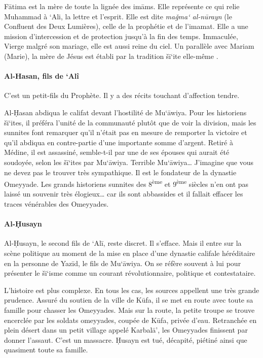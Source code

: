 Fātima est la mère de toute la lignée des imāms. Elle représente ce qui
relie Muhammad à `Ali, la lettre et l'esprit. Elle est dite \emph{maǧma`
al-nūrayn} (le Confluent des Deux Lumières), celle de la prophétie et de
l'imamat. Elle a une mission d'intercession et de protection jusqu'à la
fin des temps. Immaculée, Vierge malgré son mariage, elle est aussi
reine du ciel. Un parallèle avec Mariam (Marie), la mère de Jésus est
établi par la tradition šī`ite elle-même .

 
\paragraph{Al-Hasan, fils de
`Alî}\label{al-hasan-fils-de-aluxee}

C'est un petit-fils du Prophète. Il y a des récits touchant d'affection
tendre.

Al-Ḥasan abdiqua le califat devant l'hostilité de Mu`āwiya. Pour les
historiens šī`ites, il préféra l'unité de la communauté plutôt que de
voir la division, mais les sunnites font remarquer qu'il n'était pas en
mesure de remporter la victoire et qu'il abdiqua en contre-partie d'une
importante somme d'argent. Retiré à Médine, il est assassiné,
semble-t-il par une de ses épouses qui aurait été soudoyée, selon les
šī`ites par Mu`āwiya. Terrible Mu`āwiya\ldots{} J'imagine que vous ne
devez pas le trouver très sympathique. Il est le fondateur de la
dynastie Omeyyade. Les grands historiens sunnites des
8\textsuperscript{ème} et 9\textsuperscript{ème} siècles n'en ont pas
laissé un souvenir très élogieux\ldots{} car ils sont abbassides et il
fallait effacer les traces vénérables des Omeyyades.

 
\paragraph{Al-Ḥusayn} 

Al-Ḥusayn, le second fils de `Alī, reste discret. Il s'efface. Mais il
entre sur la scène politique au moment de la mise en place d'une
dynastie califale héréditaire en la personne de Yazīd, le fils de
Mu`āwiya. On se réfère souvent à lui pour présenter le šī`isme comme un
courant révolutionnaire, politique et contestataire.

L'histoire est plus complexe. En tous les cas, les sources appellent une
très grande prudence. Assuré du soutien de la ville de Kūfa, il se met
en route avec toute sa famille pour chasser les Omeyyades. Mais sur la
route, la petite troupe se trouve encerclée par les soldats omeyyades,
coupée de Kūfa, privée d'eau. Retranchée en plein désert dans un petit
village appelé Karbalā', les Omeyyades finissent par donner l'assaut.
C'est un massacre. Ḥusayn est tué, décapité, piétiné ainsi que quasiment
toute sa famille.

